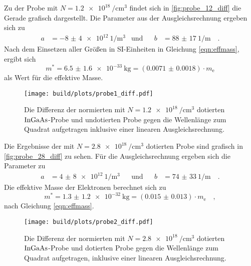     \noindent Zu der Probe mit $N = \SI{1.2e18}{\per\centi\metre\tothe{3}}$ findet sich in \autoref{fig:probe_12_diff} die Gerade grafisch dargestellt. 
    Die Parameter aus der Ausgleichsrechnung ergeben sich zu 
    \begin{align*}
        a &= \SI{-8(4)e12}{1\per\metre\tothe{3}} & \text{und} & & b &= \SI{88(17)}{1\per\metre}\quad .
    \end{align*}
    Nach dem Einsetzen aller Größen in SI-Einheiten in Gleichung \eqref{eqn:effmass}, ergibt sich 
    \begin{equation*}
        m^* = \SI{6.5(16)e-33}{\kilo\gram} = \left(\num{0.0071(18)}\right)\cdot m_\text{e}
    \end{equation*}
    als Wert für die effektive Masse. 

    \begin{figure}[H]
        \centering
        \texttt{[image: build/plots/probe1\_diff.pdf]}
        \caption{Die Differenz der normierten mit $N = \SI{1.2e18}{\per\centi\metre\tothe{3}}$ dotierten $\ce{InGaAs}$-Probe und undotierten Probe gegen 
        die Wellenlänge zum Quadrat aufgetragen inklusive einer linearen Ausgleichsrechnung.}
        \label{fig:probe_12_diff}
    \end{figure}

    \noindent Die Ergebnisse der mit $N = \SI{2.8e18}{\per\centi\metre\tothe{3}}$ dotierten Probe sind grafisch in \autoref{fig:probe_28_diff} zu sehen. 
    Für die Ausgleichsrechnung ergeben sich die Parameter zu 
    \begin{align*}
        a &= \SI{4(8)e12}{1\per\metre\tothe{3}} && \text{und} & & b &= \SI{74(33)}{1\per\metre}\quad .
    \end{align*}
    Die effektive Masse der Elektronen berechnet sich zu 
    \begin{equation*}
        m^* = \SI{1.3(12)e-32}{\kilo\gram} = \left(\num{0.015(13)}\right)\cdot m_\text{e} \quad ,
    \end{equation*}
    nach Gleichung \eqref{eqn:effmass}.

    \begin{figure}[H]
        \centering
        \texttt{[image: build/plots/probe2\_diff.pdf]}
        \caption{Die Differenz der normierten mit $N = \SI{2.8e18}{\per\centi\metre\tothe{3}}$ dotierten $\ce{InGaAs}$-Probe und dotierten Probe gegen 
        die Wellenlänge zum Quadrat aufgetragen, inklusive einer linearen Ausgleichsrechnung.}
        \label{fig:probe_28_diff}
    \end{figure}